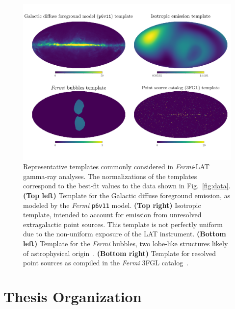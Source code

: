 \begin{figure}[htbp] 
\centering
 \includegraphics[width=1.0\textwidth]{ch-intro/templates.pdf}
\caption{Representative templates commonly considered in \emph{Fermi}-LAT gamma-ray analyses. The normalizations of the templates correspond to the best-fit values to the data shown in Fig.~\ref{fig:data}. \textbf{(Top left)} Template for the Galactic diffuse foreground emission, as modeled by the  {\it Fermi} \texttt{p6v11} model. \textbf{(Top right)} Isotropic template, intended to account for emission from unresolved extragalactic point sources. This template is not perfectly uniform due to the non-uniform exposure of the LAT instrument. \textbf{(Bottom left)} Template for the \emph{Fermi} bubbles, two lobe-like structures likely of astrophysical origin~\cite{Su:2010qj,Fermi-LAT:2014sfa}. \textbf{(Bottom right)} Template for resolved point sources as compiled in the \emph{Fermi} 3FGL catalog~\cite{Acero:2015hja}.}  
\label{fig:templates}
\end{figure}

\section{Thesis Organization}
\label{sec:summary}


